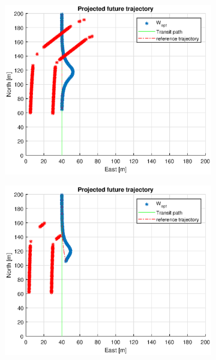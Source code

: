 \begin{figure}
\begin{subfigure}[b]{0.499\textwidth}
    \end{subfigure}
    \hfill
    \\
    \begin{subfigure}[b]{0.49\textwidth}
        \centering
        \includegraphics[width=\textwidth]{Images/Figures/sving_HO/Simple0_f999_Frame3}
    \end{subfigure}
    \hfill
    \begin{subfigure}[b]{0.499\textwidth}
        \centering
        \includegraphics[width=\textwidth]{Images/Figures/sving_HO/Simple0_f999_Frame4}

\end{subfigure}
\end{figure}
